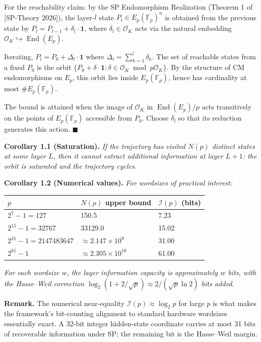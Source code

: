 \documentclass[
  11pt,
]{article}
\begin{document}
For the reachability claim: by the SP Endomorphism Realization (Theorem
1 of {[}SP-Theory 2026{]}), the layer-\(l\) state
\(P_l \in E_p(\mathbb{F}_p)^n\) is obtained from the previous state by
\(P_l = P_{l-1} + \delta_l \cdot \mathbf{1}\), where
\(\delta_l \in \mathcal{O}_K\) acts via the natural embedding
\(\mathcal{O}_K \hookrightarrow \operatorname{End}(E_p)\).

Iterating, \(P_l = P_0 + \Delta_l \cdot \mathbf{1}\) where
\(\Delta_l = \sum_{k=1}^l \delta_k\). The set of reachable states from a
fixed \(P_0\) is the orbit
\(\{P_0 + \delta \cdot \mathbf{1} : \delta \in \mathcal{O}_K \bmod p\mathcal{O}_K\}\).
By the structure of CM endomorphisms on \(E_p\), this orbit lies inside
\(E_p(\mathbb{F}_p)\), hence has cardinality at most
\(\#E_p(\mathbb{F}_p)\).

The bound is attained when the image of \(\mathcal{O}_K\) in
\(\operatorname{End}(E_p)/p\) acts transitively on the points of
\(E_p(\mathbb{F}_p)\) accessible from \(P_0\). Choose \(\delta_l\) so
that its reduction generates this action. \(\blacksquare\)

\textbf{Corollary 1.1 (Saturation).} \emph{If the trajectory has visited
\(N(p)\) distinct states at some layer \(L\), then it cannot extract
additional information at layer \(L+1\): the orbit is saturated and the
trajectory cycles.}

\textbf{Corollary 1.2 (Numerical values).} \emph{For wordsizes of
practical interest:}

\begin{longtable}[]{@{}lll@{}}
\toprule
\(p\) & \(N(p)\) upper bound & \(\mathcal{I}(p)\) (bits)\tabularnewline
\midrule
\endhead
\(2^7 - 1 = 127\) & 150.5 & 7.23\tabularnewline
\(2^{15} - 1 = 32767\) & 33129.0 & 15.02\tabularnewline
\(2^{31} - 1 = 2147483647\) & \(\approx 2.147 \times 10^9\) &
31.00\tabularnewline
\(2^{61} - 1\) & \(\approx 2.305 \times 10^{18}\) & 61.00\tabularnewline
\bottomrule
\end{longtable}

\emph{For each wordsize \(w\), the layer information capacity is
approximately \(w\) bits, with the Hasse--Weil correction
\(\log_2(1 + 2/\sqrt{p}) \approx 2/(\sqrt{p} \ln 2)\) bits added.}

\textbf{Remark.} The numerical near-equality
\(\mathcal{I}(p) \approx \log_2 p\) for large \(p\) is what makes the
framework's bit-counting alignment to standard hardware wordsizes
essentially exact. A 32-bit integer hidden-state coordinate carries at
most 31 bits of recoverable information under SP; the remaining bit is
the Hasse--Weil margin.
\end{document}
